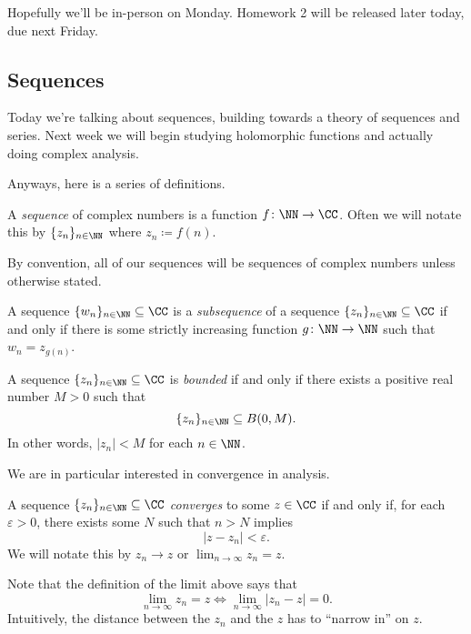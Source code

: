 \documentclass[../notes.tex]{subfiles}
\begin{document}

Hopefully we'll be in-person on Monday. Homework 2 will be released later today, due next Friday.

\subsection{Sequences}
Today we're talking about sequences, building towards a theory of sequences and series. Next week we will begin studying holomorphic functions and actually doing complex analysis.

Anyways, here is a series of definitions.
\begin{definition}[Sequence]
	A \textit{sequence} of complex numbers is a function $f\colon\NN\to\CC$. Often we will notate this by $\{z_n\}_{n\in\NN}$ where $z_n\coloneqq f(n)$.
\end{definition}
By convention, all of our sequences will be sequences of complex numbers unless otherwise stated.
\begin{definition}[Subsequence]
	A sequence $\{w_n\}_{n\in\NN}\subseteq\CC$ is a \textit{subsequence} of a sequence $\{z_n\}_{n\in\NN}\subseteq\CC$ if and only if there is some strictly increasing function $g\colon\NN\to\NN$ such that $w_n=z_{g(n)}$.
\end{definition}
\begin{definition}[Bounded]
	A sequence $\{z_n\}_{n\in\NN}\subseteq\CC$ is \textit{bounded} if and only if there exists a positive real number $M>0$ such that
	\[\{z_n\}_{n\in\NN}\subseteq B(0,M).\]
	In other words, $|z_n|<M$ for each $n\in\NN$.
\end{definition}
We are in particular interested in convergence in analysis.
\begin{definition}[Converges]
	A sequence $\{z_n\}_{n\in\NN}\subseteq\CC$ \textit{converges} to some $z\in\CC$ if and only if, for each $\varepsilon>0$, there exists some $N$ such that $n>N$ implies
	\[|z-z_n|<\varepsilon.\]
	We will notate this by $z_n\to z$ or $\lim_{n\to\infty}z_n=z$.
\end{definition}
Note that the definition of the limit above says that
\[\lim_{n\to\infty}z_n=z\iff\lim_{n\to\infty}|z_n-z|=0.\]
Intuitively, the distance between the $z_n$ and the $z$ has to ``narrow in'' on $z$. %
\end{document}

